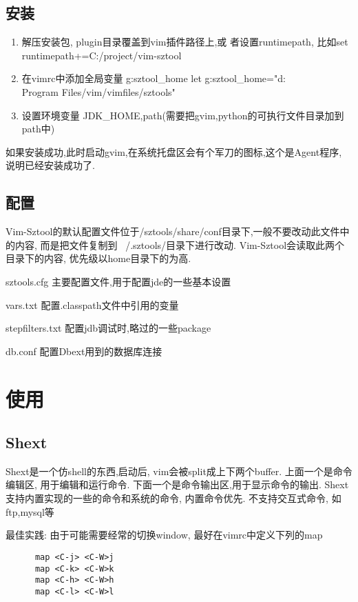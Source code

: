 \documentclass[oneside,openany]{book}
\begin{document}
  \section{安装}
    \begin{enumerate}
      \item 解压安装包, plugin目录覆盖到vim插件路径上,或
      者设置runtimepath, 比如set runtimepath+=C:/project/vim-sztool
      \item 在vimrc中添加全局变量 g:sztool\_home
      let g:sztool\_home="d:\\Program Files/vim/vimfiles/sztools"
      \item 设置环境变量
      JDK\_HOME,path(需要把gvim,python的可执行文件目录加到path中)
    \end{enumerate}
   如果安装成功,此时启动gvim,在系统托盘区会有个军刀的图标,这个是Agent程序,
   说明已经安装成功了.

  \section{配置}
    Vim-Sztool的默认配置文件位于/sztools/share/conf目录下,一般不要改动此文件中的内容,
  而是把文件复制到 ~/.sztools/目录下进行改动. Vim-Sztool会读取此两个目录下的内容,
  优先级以home目录下的为高.
  \begin{description}
    \item{sztools.cfg} 主要配置文件,用于配置jde的一些基本设置
    \item{vars.txt} 配置.classpath文件中引用的变量
    \item{stepfilters.txt} 配置jdb调试时,略过的一些package
    \item{db.conf} 配置Dbext用到的数据库连接
  \end{description}
  

\chapter{使用}
  \section{Shext}
  Shext是一个仿shell的东西,启动后, vim会被split成上下两个buffer. 上面一个是命令
编辑区, 用于编辑和运行命令. 下面一个是命令输出区,用于显示命令的输出.
  \newline
  Shext支持内置实现的一些的命令和系统的命令, 内置命令优先.
  \newline
  不支持交互式命令, 如ftp,mysql等 
  \newline
  \begin{mdframed}[style=BestPracticeFrame]
  最佳实践: 由于可能需要经常的切换window, 最好在vimrc中定义下列的map
    \begin{verbatim}
      map <C-j> <C-W>j
      map <C-k> <C-W>k
      map <C-h> <C-W>h
      map <C-l> <C-W>l
    \end{verbatim}
  \end{mdframed}
\end{document}
